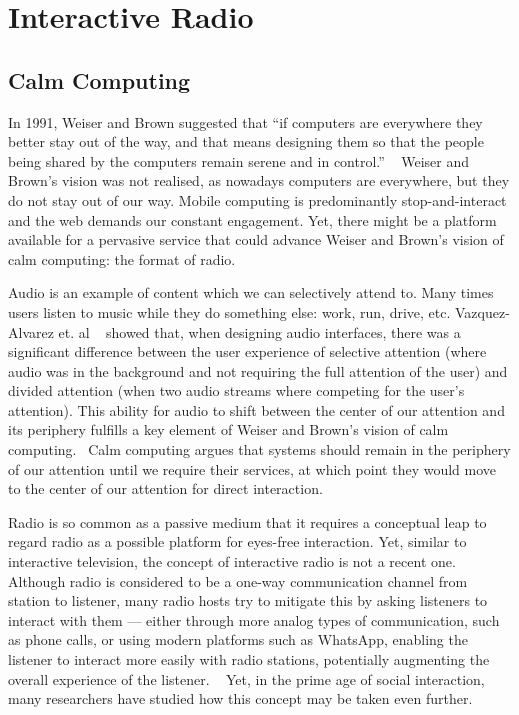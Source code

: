 \section{Interactive Radio}

\subsection{Calm Computing}

In 1991, Weiser and Brown suggested that “if computers are everywhere they better stay out of the way, and that means designing them so that the people being shared by the computers remain serene and in control.” ~\cite{Weiser1997} Weiser and Brown’s vision was not realised, as nowadays computers are everywhere, but they do not stay out of our way. Mobile computing is predominantly stop-and-interact and the web demands our constant engagement. Yet, there might be a platform available for a pervasive service that could advance Weiser and Brown’s vision of calm computing: the format of radio.

Audio is an example of content which we can selectively attend to. Many times users listen to music while they do something else: work, run, drive, etc. Vazquez-Alvarez et. al ~\cite{Vazquez-Alvarez2011} showed that, when designing audio interfaces, there was a significant difference between the user experience of selective attention (where audio was in the background and not requiring the full attention of the user) and divided attention (when two audio streams where competing for the user’s attention). This ability for audio to shift between the center of our attention and its periphery fulfills a key element of Weiser and Brown’s vision of calm computing.~\cite{Weiser1997} Calm computing argues that systems should remain in the periphery of our attention until we require their services, at which point they would move to the center of our attention for direct interaction.

Radio is so common as a passive medium that it requires a conceptual leap to regard radio as a possible platform for eyes-free interaction. Yet, similar to interactive television, the concept of interactive radio is not a recent one. Although radio is considered to be a one-way communication channel from station to listener, many radio hosts try to mitigate this by asking listeners to interact with them — either through more analog types of communication, such as phone calls, or using modern platforms such as WhatsApp, enabling the listener to interact more easily with radio stations, potentially augmenting the overall experience of the listener. ~\cite{Claes2018, Ren2004} Yet, in the prime age of social interaction, many researchers have studied how this concept may be taken even further.

